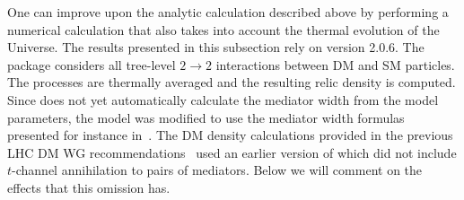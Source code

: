 One can improve upon the analytic calculation described above by performing a numerical calculation %
that also takes into account the thermal evolution of the Universe. The results presented in this subsection rely on \maddm version 2.0.6.  The \maddm package considers all tree-level $2\rightarrow2$ interactions between DM and SM particles. The processes are thermally averaged and the resulting relic density is computed.
Since \maddm does not yet automatically calculate the mediator width from the model parameters, the \dmsimp model was modified to use the mediator width formulas presented for instance in~\cite{Abercrombie:2015wmb,Boveia:2016mrp}. %
The DM density calculations provided in the previous LHC DM WG recommendations~\cite{Boveia:2016mrp} %
used an earlier version of \maddm which did not include  $t$-channel annihilation to pairs of mediators. Below we will comment on the effects that this omission has.  


